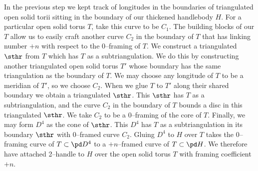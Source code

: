 




In the previous step we kept track of longitudes in the boundaries of triangulated open solid torii sitting in the boundary of our thickened handlebody $H$.
For a particular open solid torus $T$, take this curve to be $C_1$.
The building blocks of our $T$ allow us to easily craft another curve $C_2$ in the boundary of $T$ that has linking number $+n$ with respect to the 0--framing of $T$.
We construct a triangulated $\sthr$ from $T$ which has $T$ as a subtriangulation.
We do this by constructing another triangulated open solid torus $T'$ whose boundary has the same triangulation as the boundary of $T$.
We may choose any longitude of $T$ to be a meridian of $T'$, so we choose $C_2$.
When we glue $T$ to $T'$ along their shared boundary we obtain a triangulated $\sthr$.
This $\sthr$ has $T$ as a subtriangulation, and the curve $C_2$ in the boundary of $T$ bounds a disc in this triangulated $\sthr$.
We take $C_2$ to be a 0--framing of the core of $T$.
Finally, we may form $D^4$ as the cone of $\sthr$.
This $D^4$ has $T$ as a subtriangulation in its boundary $\sthr$ with 0--framed curve $C_2$.
Gluing $D^4$ to $H$ over $T$ takes the 0--framing curve of $T\subset \pd D^4$ to a $+n$--framed curve of $T\subset\pd H$.
We therefore have attached 2--handle to $H$ over the open solid torus $T$ with framing coefficient $+n$.
